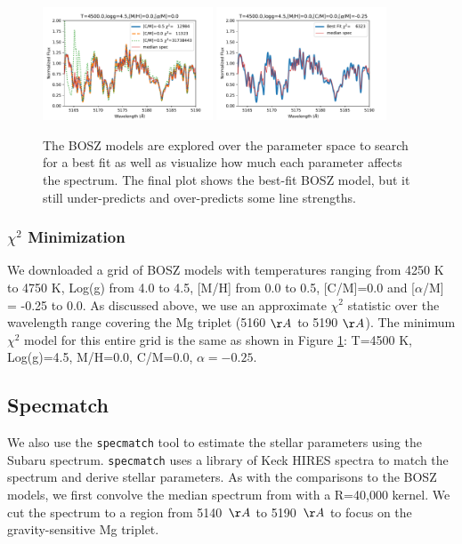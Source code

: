 \documentclass[preprint]{aastex61}
\begin{document}
\begin{figure}[!hbtp]
\begin{centering}
\includegraphics[width=0.45\textwidth]{images/bosz_model_exploration/CM_exploration.pdf}
\includegraphics[width=0.45\textwidth]{images/bosz_model_exploration/FINAL_exploration.pdf}
\caption{The BOSZ models are explored over the parameter space to search for a best fit as well as visualize how much each parameter affects the spectrum.
The final plot shows the best-fit BOSZ model, but it still under-predicts and over-predicts some line strengths.}\label{fig:boszModelParamsMedianSpec}
\end{centering}
\end{figure}

\subsubsection{$\chi^2$ Minimization}
We downloaded a grid of BOSZ models with temperatures ranging from 4250 K to 4750 K, Log(g) from 4.0 to 4.5, [M/H] from 0.0 to 0.5, [C/M]=0.0 and [$\alpha$/M] = -0.25 to 0.0.
As discussed above, we use an approximate $\chi^2$ statistic over the wavelength range covering the Mg triplet (5160 $\AA$ to 5190 $\AA$).
The minimum $\chi^2$ model for this entire grid is the same as shown in Figure \ref{fig:boszModelParamsMedianSpec}: T=4500 K, Log(g)=4.5, M/H=0.0, C/M=0.0, $\alpha=-0.25$.


\subsection{Specmatch}\label{sec:SpecMatch}

We also use the \texttt{specmatch} tool \citep{yee2017specMatch} to estimate the stellar parameters using the Subaru spectrum.
\texttt{specmatch} uses a library of Keck HIRES spectra to match the spectrum and derive stellar parameters.
As with the comparisons to the BOSZ models, we first convolve the median spectrum from \citet{masuda2018rvKIC1255} with a R=40,000 kernel.
We cut the spectrum to a region from 5140~$\AA$ to 5190~$\AA$ to focus on the gravity-sensitive Mg triplet.
\end{document}
